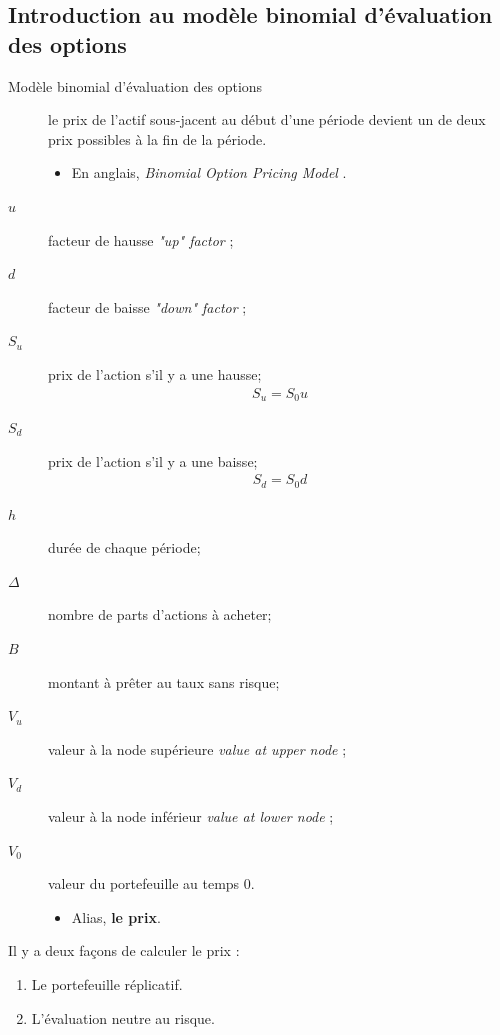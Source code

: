\documentclass[10pt, french]{article}
\begin{document}
\begin{multicols*}{2}
\newpage
\section{Introduction au modèle binomial d'évaluation des options}
\label{sec:bintree-intro}
\begin{description}
	\item[Modèle binomial d'évaluation des options]	le prix de l'actif sous-jacent au début d'une période devient un de deux prix possibles à la fin de la période.
		\begin{itemize}
		\item	En anglais, \og \textit{Binomial Option Pricing Model} \fg{}.
		\end{itemize}
\end{description}

\begin{distributions}
\begin{description}
	\item[$u$]	facteur de hausse \og \textit{"up" factor} \fg{};
	\item[$d$]	facteur de baisse \og \textit{"down" factor} \fg{};	
	\item[$S_{u}$]	prix de l'action s'il y a une hausse;
		\begin{align*}
		S_{u} = S_{0} u
		\end{align*}
	\item[$S_{d}$]	prix de l'action s'il y a une baisse;
		\begin{align*}
		S_{d} = S_{0} d
		\end{align*}
	\item[$h$]	durée de chaque période;
	\item[$\Delta$]	nombre de parts d'actions à acheter;
	\item[$B$]	montant à prêter au taux sans risque;
	\item[$V_{u}$]	valeur à la node supérieure \og \textit{value at upper node} \fg{};
	\item[$V_{d}$]	valeur à la node inférieur \og \textit{value at lower node} \fg{};
	\item[$V_{0}$]	valeur du portefeuille au temps $0$.
		\begin{itemize}
		\item	 Alias, \textbf{le prix}.
		\end{itemize}
\end{description}
\end{distributions}

Il y a deux façons de calculer le prix : 
\begin{enumerate}[label	=	\circled{\arabic*}{trueblue}]
	\item	Le portefeuille réplicatif.
	\item	L'évaluation neutre au risque.
\end{enumerate}


\end{multicols*}
\end{document}
